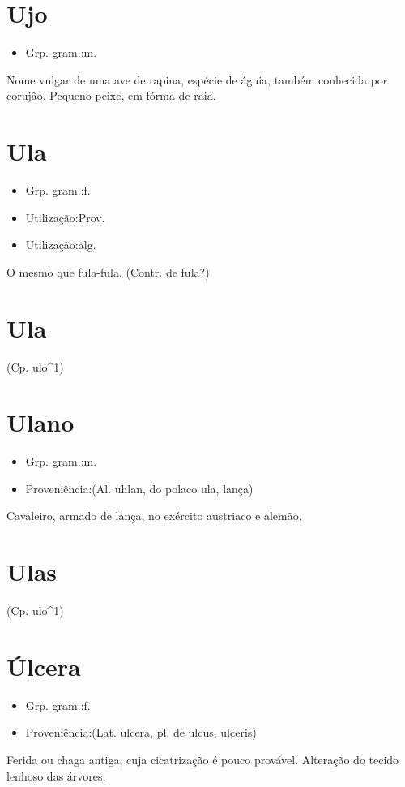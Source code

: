 \documentclass{article}
\begin{document}
\section{Ujo}
\begin{itemize}
\item {Grp. gram.:m.}
\end{itemize}
Nome vulgar de uma ave de rapina, espécie de águia, também conhecida por \textunderscore corujão\textunderscore .
Pequeno peixe, em fórma de raia.
\section{Ula}
\begin{itemize}
\item {Grp. gram.:f.}
\end{itemize}
\begin{itemize}
\item {Utilização:Prov.}
\end{itemize}
\begin{itemize}
\item {Utilização:alg.}
\end{itemize}
O mesmo que \textunderscore fula-fula\textunderscore .
(Contr. de \textunderscore fula\textunderscore ?)
\section{Ula}
(Cp. \textunderscore ulo\textunderscore ^1)
\section{Ulano}
\begin{itemize}
\item {Grp. gram.:m.}
\end{itemize}
\begin{itemize}
\item {Proveniência:(Al. \textunderscore uhlan\textunderscore , do polaco \textunderscore ula\textunderscore , lança)}
\end{itemize}
Cavaleiro, armado de lança, no exército austriaco e alemão.
\section{Ulas}
(Cp. \textunderscore ulo\textunderscore ^1)
\section{Úlcera}
\begin{itemize}
\item {Grp. gram.:f.}
\end{itemize}
\begin{itemize}
\item {Proveniência:(Lat. \textunderscore ulcera\textunderscore , pl. de \textunderscore ulcus\textunderscore , \textunderscore ulceris\textunderscore )}
\end{itemize}
Ferida ou chaga antiga, cuja cicatrização é pouco provável.
Alteração do tecido lenhoso das árvores.
\end{document}
